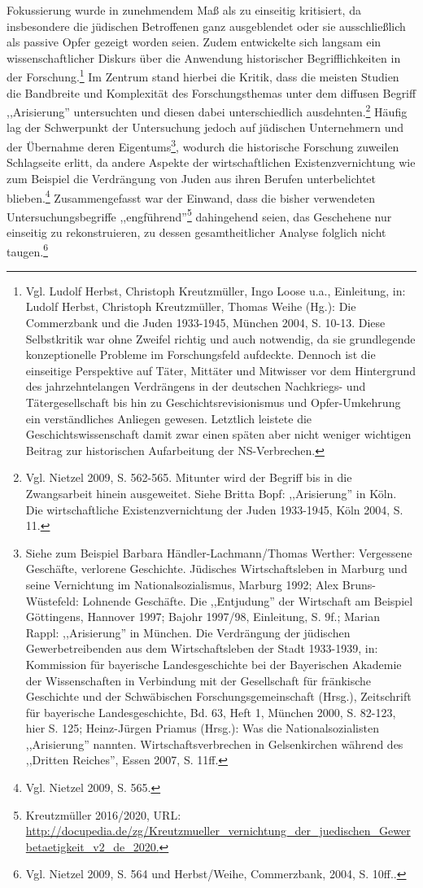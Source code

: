 Fokussierung wurde in zunehmendem Maß als zu einseitig kritisiert, da insbesondere die jüdischen Betroffenen ganz ausgeblendet oder sie ausschließlich als passive Opfer gezeigt worden seien. Zudem entwickelte sich langsam ein wissenschaftlicher Diskurs über die Anwendung historischer Begrifflichkeiten in der Forschung.\footnote{Vgl. Ludolf Herbst, Christoph Kreutzmüller, Ingo Loose u.a., Einleitung, in: Ludolf Herbst, Christoph Kreutzmüller, Thomas Weihe (Hg.): Die Commerzbank und die Juden 1933-1945, München 2004, S. 10-13. Diese Selbstkritik war ohne Zweifel richtig und auch notwendig, da sie grundlegende konzeptionelle Probleme im Forschungsfeld aufdeckte. Dennoch ist die einseitige Perspektive auf Täter, Mittäter und Mitwisser vor dem Hintergrund des jahrzehntelangen Verdrängens in der deutschen Nachkriegs- und Tätergesellschaft bis hin zu Geschichtsrevisionismus und Opfer-Umkehrung ein verständliches Anliegen gewesen. Letztlich leistete die Geschichtswissenschaft damit zwar einen späten aber nicht weniger wichtigen Beitrag zur historischen Aufarbeitung der NS-Verbrechen.} Im Zentrum stand hierbei die Kritik, dass die meisten Studien die Bandbreite und Komplexität des Forschungsthemas unter dem diffusen Begriff ,,Arisierung'' untersuchten und diesen dabei unterschiedlich ausdehnten.\footnote{Vgl. Nietzel 2009, S. 562-565. Mitunter wird der Begriff bis in die Zwangsarbeit hinein ausgeweitet. Siehe Britta Bopf: ,,Arisierung'' in Köln. Die wirtschaftliche Existenzvernichtung der Juden 1933-1945, Köln 2004, S. 11.} Häufig lag der Schwerpunkt der Untersuchung jedoch auf jüdischen Unternehmern und der Übernahme deren Eigentums\footnote{Siehe zum Beispiel Barbara Händler-Lachmann/Thomas Werther: Vergessene Geschäfte, verlorene Geschichte. Jüdisches Wirtschaftsleben in Marburg und seine Vernichtung im Nationalsozialismus, Marburg 1992; Alex Bruns-Wüstefeld: Lohnende Geschäfte. Die ,,Entjudung'' der Wirtschaft am Beispiel Göttingens, Hannover 1997; Bajohr 1997/98, Einleitung, S. 9f.; Marian Rappl: ,,Arisierung'' in München. Die Verdrängung der jüdischen Gewerbetreibenden aus dem Wirtschaftsleben der Stadt 1933-1939, in: Kommission für bayerische Landesgeschichte bei der Bayerischen Akademie der Wissenschaften in Verbindung mit der Gesellschaft für fränkische Geschichte und der Schwäbischen Forschungsgemeinschaft (Hrsg.), Zeitschrift für bayerische Landesgeschichte, Bd. 63, Heft 1, München 2000, S. 82-123, hier S. 125; Heinz-Jürgen Priamus (Hrsg.): Was die Nationalsozialisten ,,Arisierung'' nannten. Wirtschaftsverbrechen in Gelsenkirchen während des ,,Dritten Reiches'', Essen 2007, S. 11ff.}, wodurch die historische Forschung zuweilen Schlagseite erlitt, da andere Aspekte der wirtschaftlichen Existenzvernichtung wie zum Beispiel die Verdrängung von Juden aus ihren Berufen unterbelichtet blieben.\footnote{Vgl. Nietzel 2009, S. 565.} Zusammengefasst war der Einwand, dass die bisher verwendeten Untersuchungsbegriffe ,,engführend''\footnote{Kreutzmüller 2016/2020,  URL: \url{http://docupedia.de/zg/Kreutzmueller_vernichtung_der_juedischen_Gewerbetaetigkeit_v2_de_2020.}} dahingehend seien, das Geschehene nur einseitig zu rekonstruieren, zu dessen gesamtheitlicher Analyse folglich nicht taugen.\footnote{Vgl. Nietzel 2009, S. 564 und Herbst/Weihe, Commerzbank, 2004, S. 10ff..}

